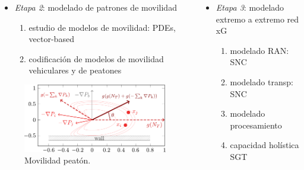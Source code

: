 \documentclass[xcolor=table,xcolor=x11names]{beamer}
\begin{document}
\begin{frame}{\subsecname}

    \begin{columns}[T] %
        \begin{column}{.48\textwidth}



            \begin{itemize}
                \item \emph{Etapa 2}: modelado de patrones de
                    movilidad
                    \begin{enumerate}
                        \item estudio de modelos de movilidad:
                            PDEs, vector-based
                        \item codificación de modelos de
                            movilidad vehiculares y de peatones
                    \end{enumerate}
            \end{itemize}


            \begin{figure}[t]
                \centering
                \includegraphics[width=.8\textwidth]{figures/isolines.pdf}
                \caption{Movilidad peatón.}
            \end{figure}


        \end{column}
        \begin{column}{.48\textwidth}
            \begin{itemize}
                \item \emph{Etapa 3}: modelado extremo a extremo
                    red xG
                \begin{enumerate}
                    \item modelado RAN: SNC
                    \item modelado transp: SNC 
                    \item modelado procesamiento
                    \item capacidad holística SGT
                \end{enumerate}
            \end{itemize}


\end{column}
\end{columns}
\end{frame}
\end{document}
